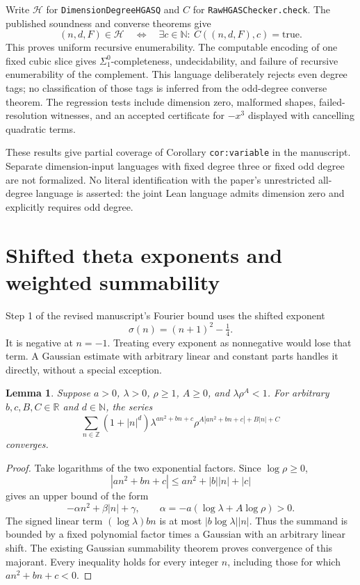 \documentclass[11pt]{article}
\newtheorem{lemma}[theorem]{Lemma}
\newcommand{\R}{\mathbb R}
\newcommand{\N}{\mathbb N}
\newcommand{\Z}{\mathbb Z}
\newcommand{\code}[1]{{\small\nolinkurl{#1}}}
\begin{document}
Write $\mathcal H$ for \code{DimensionDegreeHGASQ} and $C$ for
\code{RawHGASChecker.check}. The published soundness and converse theorems give
\[
 (n,d,F)\in\mathcal H
 \quad\Longleftrightarrow\quad
 \exists c\in\N:\ C((n,d,F),c)=\mathrm{true}.
\]
This proves uniform recursive enumerability. The computable encoding of
one fixed cubic slice gives $\Sigma^0_1$-completeness, undecidability, and
failure of recursive enumerability of the complement. This language
deliberately rejects even degree tags; no classification of those tags
is inferred from the odd-degree converse theorem. The regression tests
include dimension zero, malformed shapes, failed-resolution witnesses,
and an accepted certificate for $-x^3$ displayed with cancelling quadratic
terms.

These results give partial coverage of Corollary \code{cor:variable} in
the manuscript. Separate dimension-input languages with fixed degree
three or fixed odd degree are not formalized. No literal identification
with the paper's unrestricted all-degree language is asserted: the joint
Lean language admits dimension zero and explicitly requires odd degree.

\section{Shifted theta exponents and weighted summability}

Step 1 of the revised manuscript's Fourier bound uses the shifted exponent
\[
 \sigma(n)=(n+1)^2-\tfrac14.
\]
It is negative at $n=-1$. Treating every exponent as nonnegative would lose
that term. A Gaussian estimate with arbitrary linear and constant parts
handles it directly, without a special exception.

\begin{lemma}\label{lem:gaussian}
Suppose $a>0$, $\lambda>0$, $\rho\ge1$, $A\ge0$, and
$\lambda\rho^A<1$. For arbitrary $b,c,B,C\in\R$ and $d\in\N$, the series
\[
 \sum_{n\in\Z}(1+|n|^d)
 \lambda^{a n^2+bn+c}
 \rho^{A|a n^2+bn+c|+B|n|+C}
\]
converges.
\end{lemma}

\begin{proof}
Take logarithms of the two exponential factors. Since $\log\rho\ge0$,
\[
 |an^2+bn+c|\le an^2+|b||n|+|c|
\]
gives an upper bound of the form
\[
 -\alpha n^2+\beta|n|+\gamma,
 \qquad \alpha=-a(\log\lambda+A\log\rho)>0.
\]
The signed linear term $(\log\lambda)bn$ is at most
$|b\log\lambda||n|$. Thus the summand is bounded by a fixed polynomial
factor times a Gaussian with an arbitrary linear shift. The existing
Gaussian summability theorem proves convergence of this majorant.
Every inequality holds for every integer $n$, including those for which
$an^2+bn+c<0$.
\end{proof}
\end{document}
